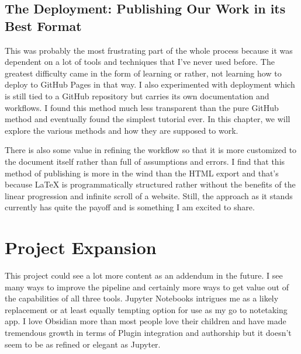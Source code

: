 \documentclass[letterpaper,12pt,english]{sphinxmanual}
\begin{document}
\subsection{The Deployment: Publishing Our Work in its Best Format}
\label{\detokenize{_notebooks/00-the-goal:the-deployment-publishing-our-work-in-its-best-format}}
\sphinxAtStartPar
This was probably the most frustrating part of the whole process because it was dependent on a lot of tools and techniques that I’ve never used before. The greatest difficulty came in the form of learning  \textendash{}or rather, not learning\textendash{} how to deploy to GitHub Pages in that way. I also experimented with  deployment which is still tied to a GitHub repository but carries its own documentation and workflows. I found this method much less transparent than the pure GitHub method and eventually found the simplest tutorial ever. In this chapter, we will explore the various methods and how they are supposed to work.

\sphinxAtStartPar
There is also some value in refining the  workflow so that it is more customized to the document itself rather than full of assumptions and errors. I find that this method of publishing is more in the wind than the HTML export and that’s because LaTeX is programmatically structured rather without the benefits of the linear progression and infinite scroll of a website. Still, the approach as it stands currently has quite the payoff and is something I am excited to share.


\section{Project Expansion}
\label{\detokenize{_notebooks/00-the-goal:project-expansion}}
\sphinxAtStartPar
This project could see a lot more content as an addendum in the future. I see many ways to improve the pipeline and certainly more ways to get value out of the capabilities of all three tools. Jupyter Notebooks intrigues me as a likely replacement \textendash{}or at least equally tempting option\textendash{} for use as my go to note\sphinxhyphen{}taking app. I love Obsidian more than most people love their children and have made tremendous growth in terms of Plugin integration and authorship but it doesn’t seem to be as refined or elegant as Jupyter.
\end{document}
